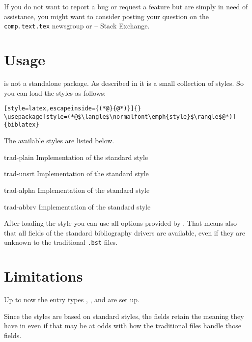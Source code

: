\documentclass{ltxdockit}[2011/03/25]
\begin{document}
If you do not want to report a bug or request a feature but are simply in need of assistance, you might want to consider posting your question on the \texttt{comp.text.tex} newsgroup or \tex{} -- \latex Stack Exchange.

\section{Usage}

 is not a standalone package. As described in  it is
a small collection of styles. So you can load the styles as follows:

\begin{lstlisting}[style=latex,escapeinside={(*@}{@*)}]{}
\usepackage[style=(*@$\langle$\normalfont\emph{style}$\rangle$@*)]{biblatex}
\end{lstlisting}
The available styles are listed below.
\begin{marglist}

\item[trad-plain] Implementation of the standard style 
\item[trad-unsrt] Implementation of the standard style 
\item[trad-alpha] \BiberOnlyMark Implementation of the standard style 
\item[trad-abbrv] Implementation of the standard style 

\end{marglist}

After loading the style you can use all options provided by .
That means also that all fields of the standard bibliography drivers are available,
even if they are unknown to the traditional \texttt{.bst} files.

\section{Limitations}

Up to now the entry types , , 
and  are set up.

Since the styles are based on  standard styles, the fields retain the meaning
they have in  even if that may be at odds with how the traditional 
files handle those fields.
\end{document}
